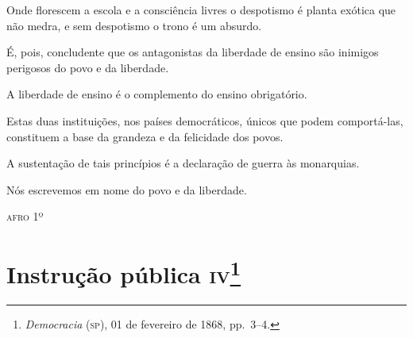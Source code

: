 Onde florescem a escola e a consciência livres o despotismo é planta
exótica que não medra, e sem despotismo o trono é um absurdo.

É, pois, concludente que os antagonistas da liberdade de ensino são
inimigos perigosos do povo e da liberdade.

A liberdade de ensino é o complemento do ensino obrigatório.

Estas duas instituições, nos países democráticos, únicos que podem
comportá-las, constituem a base da grandeza e da felicidade dos povos.

A sustentação de tais princípios é a declaração de guerra às monarquias.

Nós escrevemos em nome do povo e da liberdade.

\begin{flushright}
\textsc{afro} 1º
\end{flushright}

\chapter{Instrução pública \textsc{iv}\footnote{\emph{Democracia} (\textsc{sp}),
  01 de fevereiro de 1868, pp.~3--4.}} %

